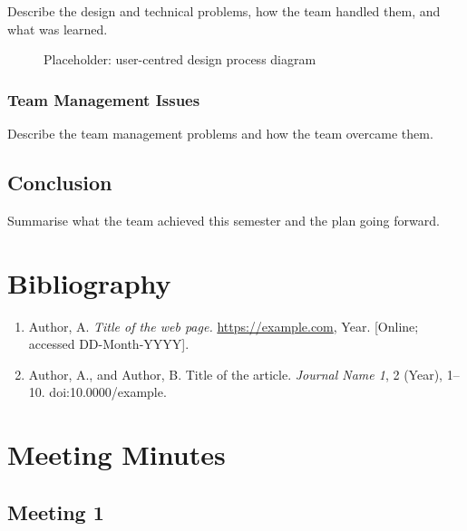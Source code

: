 \documentclass[
  12pt,
  a4paper,
]{report}
\providecommand{\tightlist}{%
  \setlength{\itemsep}{0pt}\setlength{\parskip}{0pt}}
\begin{document}
Describe the design and technical problems, how the team handled them,
and what was learned.

\begin{figure}
\centering
{}
\caption{Placeholder: user-centred design process diagram}
\end{figure}

\subsection{Team Management Issues}\label{team-management-issues}

Describe the team management problems and how the team overcame them.

\section{Conclusion}\label{conclusion}

Summarise what the team achieved this semester and the plan going
forward.

\chapter*{Bibliography}\label{bibliography}

\begin{enumerate}
\def\labelenumi{\arabic{enumi}.}
\tightlist
\item
  Author, A. \emph{Title of the web page.} \url{https://example.com},
  Year. {[}Online; accessed DD-Month-YYYY{]}.
\item
  Author, A., and Author, B. Title of the article. \emph{Journal Name
  1}, 2 (Year), 1--10. doi:10.0000/example.
\end{enumerate}

\appendix

\chapter{Meeting Minutes}\label{meeting-minutes}

\section{Meeting 1}\label{meeting-1}
\end{document}
